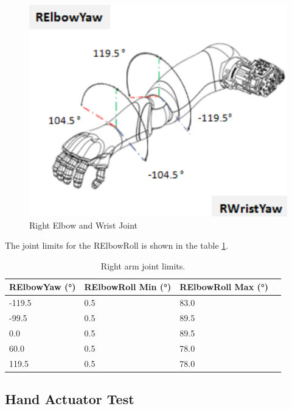 \documentclass{CSSRforAfrica}
\begin{document}
\begin{figure}[!hbpt]
    \begin{minipage}{0.45\textwidth}
        \centering
        \includegraphics[scale=0.45]{images/RElbowandWrist.png}
        \caption{Right Elbow and Wrist Joint \cite{PepperJoints}}
        \label{fig: Right Elbow and Wrist joint}
    \end{minipage}
\end{figure}

The joint limits for the RElbowRoll is shown in the table \ref{tab:right_arm_joint_limits}.
\begin{longtable}[c]{|l|l|l|l|} 
    \caption{Right arm joint limits. \cite{PepperJoints}} \label{tab:right_arm_joint_limits}\\
    \hline
    \rowcolor{gray!30}
    \textbf{RElbowYaw (°)} & \textbf{RElbowRoll Min (°)} & \textbf{RElbowRoll Max (°)} \\ \hline
    \endhead %
    
    -119.5 & 0.5 & 83.0 \\ \hline
    -99.5 & 0.5 & 89.5 \\ \hline
    0.0 & 0.5 & 89.5 \\ \hline
    60.0 & 0.5 & 78.0 \\ \hline
    119.5 & 0.5 & 78.0 \\ \hline

\end{longtable}

\subsection{Hand Actuator Test}
\end{document}
